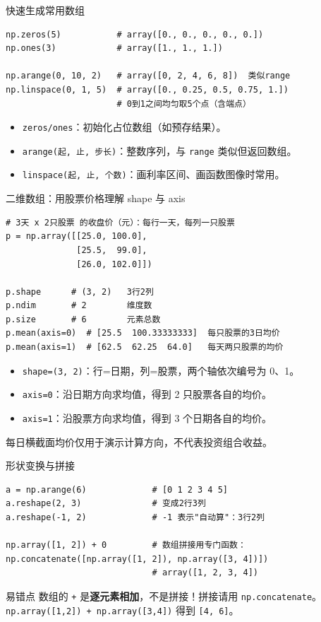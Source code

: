 \documentclass[9pt]{ctexbeamer}
\begin{document}
\begin{frame}[fragile]{快速生成常用数组}
	\begin{lstlisting}
np.zeros(5)           # array([0., 0., 0., 0., 0.])
np.ones(3)            # array([1., 1., 1.])

np.arange(0, 10, 2)   # array([0, 2, 4, 6, 8])  类似range
np.linspace(0, 1, 5)  # array([0., 0.25, 0.5, 0.75, 1.])
                      # 0到1之间均匀取5个点（含端点）
\end{lstlisting}
	\begin{itemize}
		\item \texttt{zeros/ones}：初始化占位数组（如预存结果）。
		\item \texttt{arange(起, 止, 步长)}：整数序列，与 \texttt{range} 类似但返回数组。
		\item \texttt{linspace(起, 止, 个数)}：画利率区间、画函数图像时常用。
	\end{itemize}
\end{frame}

\begin{frame}[fragile]{二维数组：用股票价格理解 shape 与 axis}
	\begin{lstlisting}
# 3天 x 2只股票 的收盘价（元）：每行一天，每列一只股票
p = np.array([[25.0, 100.0],
              [25.5,  99.0],
              [26.0, 102.0]])

p.shape      # (3, 2)   3行2列
p.ndim       # 2        维度数
p.size       # 6        元素总数
p.mean(axis=0)  # [25.5  100.33333333]  每只股票的3日均价
p.mean(axis=1)  # [62.5  62.25  64.0]   每天两只股票的均价
\end{lstlisting}
	\begin{itemize}
		\item \texttt{shape=(3, 2)}：\alert{行=日期，列=股票}，两个轴依次编号为 0、1。
		\item \texttt{axis=0}：沿日期方向求均值，得到 2 只股票各自的均价。
		\item \texttt{axis=1}：沿股票方向求均值，得到 3 个日期各自的均价。
	\end{itemize}
	{\footnotesize 每日横截面均价仅用于演示计算方向，不代表投资组合收益。}
\end{frame}

\begin{frame}[fragile]{形状变换与拼接}
	\begin{lstlisting}
a = np.arange(6)             # [0 1 2 3 4 5]
a.reshape(2, 3)              # 变成2行3列
a.reshape(-1, 2)             # -1 表示"自动算"：3行2列

np.array([1, 2]) + 0         # 数组拼接用专门函数：
np.concatenate([np.array([1, 2]), np.array([3, 4])])
                             # array([1, 2, 3, 4])
\end{lstlisting}
	\begin{alertblock}{易错点}
		数组的 \texttt{+} 是\textbf{逐元素相加}，不是拼接！拼接请用 \texttt{np.concatenate}。\\
		\texttt{np.array([1,2]) + np.array([3,4])} 得到 \texttt{[4, 6]}。
	\end{alertblock}
\end{frame}
\end{document}
